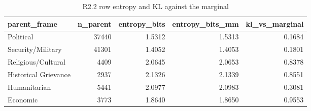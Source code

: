 \begin{table}
\caption{R2.2 row entropy and KL against the marginal}
\label{tab:r1r2_transition_entropy}
\begin{tabular}{lrrrr}
\toprule
parent\_frame & n\_parent & entropy\_bits & entropy\_bits\_mm & kl\_vs\_marginal \\
\midrule
Political & 37440 & 1.5312 & 1.5313 & 0.1684 \\
Security/Military & 41301 & 1.4052 & 1.4053 & 0.1801 \\
Religious/Cultural & 4409 & 2.0645 & 2.0653 & 0.8378 \\
Historical Grievance & 2937 & 2.1326 & 2.1339 & 0.8551 \\
Humanitarian & 5441 & 2.0977 & 2.0983 & 0.3081 \\
Economic & 3773 & 1.8640 & 1.8650 & 0.9553 \\
\bottomrule
\end{tabular}
\end{table}
